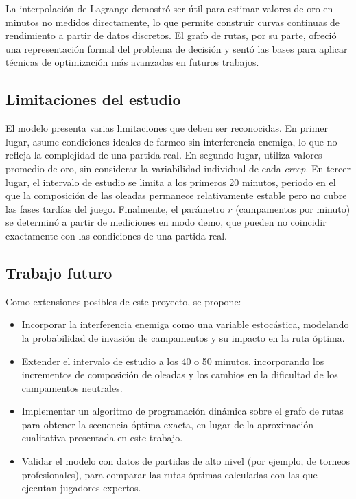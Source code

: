 La interpolación de Lagrange demostró ser útil para estimar valores de oro en minutos no medidos directamente, lo que permite construir curvas continuas de rendimiento a partir de datos discretos. El grafo de rutas, por su parte, ofreció una representación formal del problema de decisión y sentó las bases para aplicar técnicas de optimización más avanzadas en futuros trabajos.

\subsection{Limitaciones del estudio}

El modelo presenta varias limitaciones que deben ser reconocidas. En primer lugar, asume condiciones ideales de farmeo sin interferencia enemiga, lo que no refleja la complejidad de una partida real. En segundo lugar, utiliza valores promedio de oro, sin considerar la variabilidad individual de cada \textit{creep}. En tercer lugar, el intervalo de estudio se limita a los primeros 20 minutos, periodo en el que la composición de las oleadas permanece relativamente estable pero no cubre las fases tardías del juego. Finalmente, el parámetro \(r\) (campamentos por minuto) se determinó a partir de mediciones en modo demo, que pueden no coincidir exactamente con las condiciones de una partida real.

\subsection{Trabajo futuro}

Como extensiones posibles de este proyecto, se propone:
\begin{itemize}
    \item Incorporar la interferencia enemiga como una variable estocástica, modelando la probabilidad de invasión de campamentos y su impacto en la ruta óptima.
    \item Extender el intervalo de estudio a los 40 o 50 minutos, incorporando los incrementos de composición de oleadas y los cambios en la dificultad de los campamentos neutrales.
    \item Implementar un algoritmo de programación dinámica sobre el grafo de rutas para obtener la secuencia óptima exacta, en lugar de la aproximación cualitativa presentada en este trabajo.
    \item Validar el modelo con datos de partidas de alto nivel (por ejemplo, de torneos profesionales), para comparar las rutas óptimas calculadas con las que ejecutan jugadores expertos.
\end{itemize}

